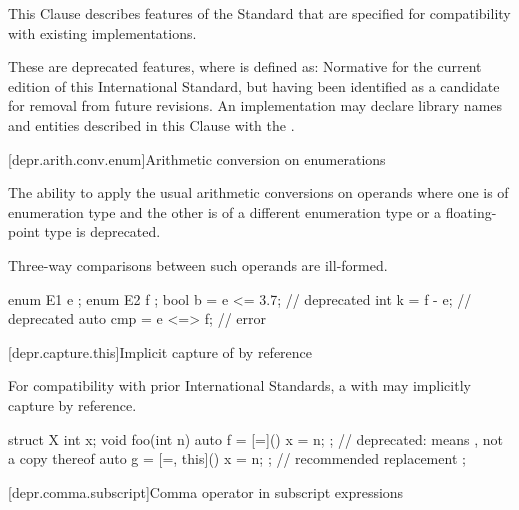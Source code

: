 
\newcommand{\requires}{\Fundesc{Requires}}

\pnum
This Clause describes features of the \Cpp{} Standard that are specified for compatibility with
existing implementations.

\pnum
These are deprecated features, where
is defined as:
Normative for the current edition of this International Standard,
but having been identified as a candidate for removal from future revisions.
An implementation may declare library names and entities described in this Clause with the
.

[depr.arith.conv.enum]{Arithmetic conversion on enumerations}

\pnum
The ability to apply the usual arithmetic conversions
on operands where one is of enumeration type
and the other is of a different enumeration type
or a floating-point type
is deprecated.
\begin{note}
Three-way comparisons between such operands are ill-formed.
\end{note}
\begin{example}
\begin{codeblock}
enum E1 { e };
enum E2 { f };
bool b = e <= 3.7;              // deprecated
int k = f - e;                  // deprecated
auto cmp = e <=> f;             // error
\end{codeblock}
\end{example}

[depr.capture.this]{Implicit capture of  by reference}

\pnum
For compatibility with prior \Cpp{} International Standards,
a  with 
\tcode{=} may implicitly capture
 by reference.
\begin{example}
\begin{codeblock}
struct X {
  int x;
  void foo(int n) {
    auto f = [=]() { x = n; };          // deprecated:  means , not a copy thereof
    auto g = [=, this]() { x = n; };    // recommended replacement
  }
};
\end{codeblock}
\end{example}

[depr.comma.subscript]{Comma operator in subscript expressions}

